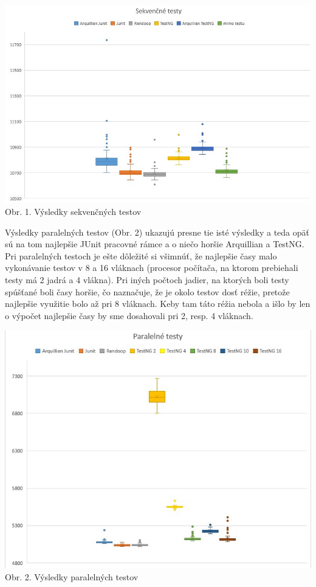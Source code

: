 \documentclass[11pt,twoside,slovak,a4paper]{article}
\begin{document}
	\begin{center}
		\includegraphics[width = 400pt]{sekvencne}
		\newline
		\tiny Obr. 1. Výsledky sekvenčných testov
	\end{center}
	
	Výsledky paralelných testov (Obr. 2) ukazujú presne tie isté výsledky a teda opäť sú na tom najlepšie JUnit pracovné rámce a o niečo horšie Arquillian a TestNG. Pri paralelných testoch je ešte dôležité si všimnúť, že najlepšie časy malo vykonávanie testov v 8 a 16 vláknach (procesor počítača, na ktorom prebiehali testy má 2 jadrá a 4 vlákna). Pri iných počtoch jadier, na ktorých boli testy spúšťané boli časy horšie, čo naznačuje, že je okolo testov dosť réžie, pretože najlepšie využitie bolo až pri 8 vláknach. Keby tam táto réžia nebola a išlo by len o výpočet najlepšie časy by sme dosahovali pri 2, resp. 4 vláknach.
	
	\begin{center}
		\includegraphics[width = 400pt]{paralelne}
		\newline
		\tiny Obr. 2. Výsledky paralelných testov
	\end{center}
	
\end{document}
